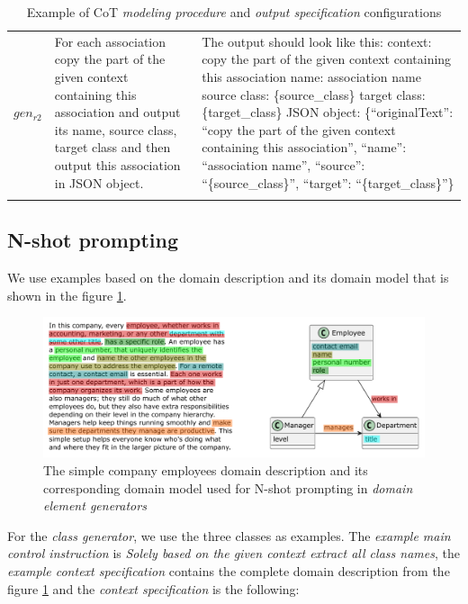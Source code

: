 \begin{table}[!h]
\begin{tabular}{@{}l>{\raggedright\arraybackslash}p{}>{\raggedright\arraybackslash}p{}@{}}
$gen_{r2}$ & For each association copy the part of the given context containing this association and output its name, source class, target class and then output this association in JSON object. &
The output should look like this: \newline
context: copy the part of the given context containing this association \newline
name: association name \newline
source class: \{source\_class\} \newline
target class: \{target\_class\} \newline
JSON object: \{``originalText'': ``copy the part of the given context containing this association'', ``name'': ``association name'', ``source'': ``\{source\_class\}'', ``target'': ``\{target\_class\}''\} \\

	\addlinespace
	\bottomrule
	\addlinespace
	\end{tabular}
	\caption{Example of CoT \emph{modeling procedure} and \emph{output specification} configurations}
	\label{tab:cot-prompt-templates}
\end{table}


\subsection{N-shot prompting}

We use examples based on the domain description and its domain model that is shown in the figure \ref{fig:prompting-domain}.

\begin{figure}[!h]
    \centering
    \includegraphics[scale=0.6]{img/prompting-domain.pdf}
    \caption{\centering The simple company employees domain description and its corresponding domain model used for N-shot prompting in \emph{domain element generators}}
    \label{fig:prompting-domain}
\end{figure}

For the \emph{class generator}, we use the three classes as examples. The \emph{example main control instruction} is \textit{Solely based on the given context extract all class names}, the \emph{example context specification} contains the complete domain description from the figure \ref{fig:prompting-domain} and the \emph{context specification} is the following: \\

